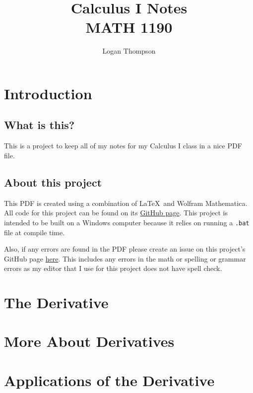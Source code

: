

\title{
    Calculus I Notes\\
    \large MATH 1190}
\author{Logan Thompson}
\date{}


\hypersetup{pageanchor=false}
\maketitle
\hypersetup{pageanchor=true}
\tableofcontents
\newpage
\chapter*{Introduction}
\section*{What is this?}
This is a project to keep all of my notes for my Calculus I class in a nice PDF file.
\section*{About this project}
This PDF is created using a combination of \LaTeX\ and Wolfram Mathematica. All code for this project can be found on its \href{https://github.com/Cobbleopolis/Calculus-Notes}{GitHub page}. This project is intended to be built on a Windows computer because it relies on running a \texttt{.bat} file at compile time.

Also, if any errors are found in the PDF please create an issue on this project's GitHub page \href{https://github.com/Cobbleopolis/Calculus-Notes/issues}{here}. This includes any errors in the math or spelling or grammar errors as my editor that I use for this project does not have spell check.
\chapter{The Derivative}





\chapter{More About Derivatives}




\chapter{Applications of the Derivative}

\appendix


